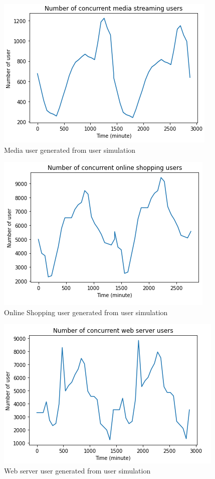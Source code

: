 \documentclass[conference]{IEEEtran}
\begin{document}
\begin{figure}[]
    \centering
        \includegraphics[scale = 0.8]{imgs/media_streaming_concurrent_user_2days.png}
        \caption{Media user generated from user simulation}
        \label{fig:media_user}
    \end{figure}

\begin{figure}[]
    \centering
        \includegraphics[scale = 0.8]{imgs/online_shopping_concurrent_users_2days.png}
        \caption{Online Shopping user generated from user simulation}
        \label{fig:shopping_user}
    \end{figure}

\begin{figure}[]
    \centering
        \includegraphics[scale = 0.8]{imgs/web_server_concurrent_user_2days.png}
        \caption{Web server user generated from user simulation}
        \label{fig:webServinguser}
    \end{figure}
\end{document}
